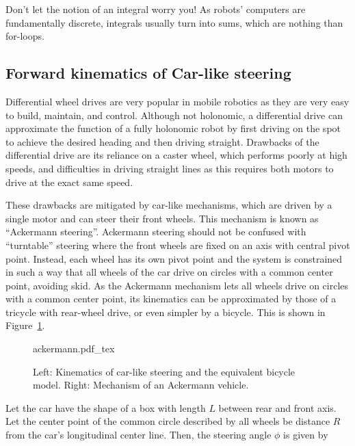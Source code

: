 \begin{framed}
Don't let the notion of an integral worry you! As robots' computers are fundamentally discrete, integrals usually turn into sums, which are nothing than for-loops.
\end{framed}



\subsection{Forward kinematics of Car-like steering}\label{sec:carsteering}
Differential wheel drives are very popular in mobile robotics as they are very easy to build, maintain, and control. Although not holonomic, a differential drive can approximate the function of a fully holonomic robot by first driving on the spot to achieve the desired heading and then driving straight. Drawbacks of the differential drive are its reliance on a caster wheel, which performs poorly at high speeds, and difficulties in driving straight lines as this requires both motors to drive at the exact same speed.


These drawbacks are mitigated by car-like mechanisms, which are driven by a single motor and can steer their front wheels. This mechanism is known as ``Ackermann steering''.  Ackermann steering should not be confused with ``turntable'' steering  where the front wheels are fixed on an axis with central pivot point. Instead, each wheel has its own pivot point and the system is constrained in such a way that all wheels of the car drive on circles with a common center point, avoiding skid. As the Ackermann mechanism lets all wheels drive on circles with a common center point, its kinematics can be approximated by those of a tricycle with rear-wheel drive, or even simpler by a bicycle. This is shown in Figure~\ref{fig:ackermann}.

\begin{figure}[htb!]
    \centering
    \def\svgwidth{0.9\textwidth}
    {ackermann.pdf_tex}
    \caption{Left: Kinematics of car-like steering and the equivalent bicycle model. Right: Mechanism of an Ackermann vehicle.}
    \label{fig:ackermann}
\end{figure}

Let the car have the shape of a box with length $L$ between rear and front axis. Let the center point of the common circle described by all wheels be distance $ R$ from the car's longitudinal center line.  Then, the steering angle $ \phi$ is given by

